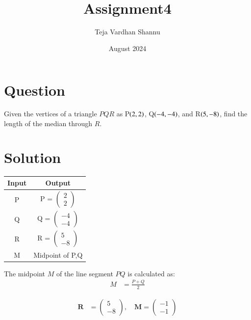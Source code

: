 \documentclass[journal]{IEEEtran}
\title{Assignment4}
\author{Teja Vardhan Shannu}
\date{August 2024}
\numberwithin{equation}{enumi}
\numberwithin{figure}{enumi}
\begin{document}
\maketitle

\section*{Question}
Given the vertices of a triangle \( PQR \) as P$\left(2,2\right)$, Q$\left(-4,-4\right)$, and R$\left(5,-8\right)$, find the length of the median through \( R \).

\section*{Solution}


\begin{table}[h!]
\centering    

\begin{tabular}{|c|c|}
\hline

Input & Output \\
\hline
P & {P} = $\begin{pmatrix} 2 \\ 2 \end{pmatrix}$ \\
Q & {Q} = $\begin{pmatrix} -4 \\ -4 \end{pmatrix}$\\
R & {R} = $\begin{pmatrix} 5 \\ -8 \end{pmatrix} $\\
M & Midpoint of P,Q    \\

\hline
\end{tabular}
\end{table}






The midpoint \( M \) of the line segment \( PQ \) is calculated as:
\begin{align}
	M &=  \frac{P + Q}{2}
\end{align}




\begin{align}
	\mathbf{R} &= \begin{pmatrix} 5 \\ -8 \end{pmatrix}, \quad \mathbf{M} = \begin{pmatrix} -1 \\ -1 \end{pmatrix}
\end{align}
\end{document}
